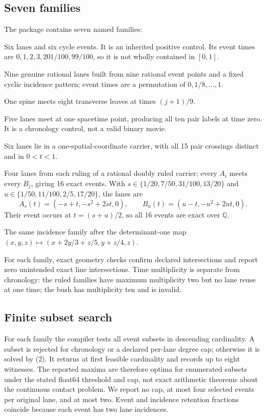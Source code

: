 \documentclass[11pt]{article}
\theoremstyle{definition}
\theoremstyle{remark}
\newcommand{\Q}{\mathbb Q}
\begin{document}
\subsection{Seven families}
The package contains seven named families:
\begin{description}[leftmargin=2em,style=nextline]
\item[Strict $C_{12}$ control.] Six lanes and six cycle events. It is an inherited positive control. Its event times are $0,1,2,3,201/100,99/100$, so it is not wholly contained in $[0,1]$.
\item[Generic rational $C_{18}$.] Nine genuine rational lanes built from nine rational event points and a fixed cyclic incidence pattern; event times are a permutation of $0,1/8,\ldots,1$.
\item[Time-separated hinge.] One spine meets eight transverse leaves at times $(j+1)/9$.
\item[Simultaneous bush $K_5$.] Five lanes meet at one spacetime point, producing all ten pair labels at time zero. It is a chronology control, not a valid binary movie.
\item[Planar weave $K_6$.] Six lanes lie in a one-spatial-coordinate carrier, with all 15 pair crossings distinct and in $0<t<1$.
\item[Ruled $K_{4,4}$.] Four lanes from each ruling of a rational doubly ruled carrier; every $A_i$ meets every $B_j$, giving 16 exact events. With $s\in\{1/20,7/50,31/100,13/20\}$ and $u\in\{1/50,11/100,2/5,17/20\}$, the lanes are
\[
 A_s(t)=(-s+t,-s^2+2st,0),\qquad B_u(t)=(u-t,-u^2+2ut,0).
\]
Their event occurs at $t=(s+u)/2$, so all 16 events are exact over $\Q$.
\item[Sheared ruled $K_{4,4}$.] The same incidence family after the determinant-one map $(x,y,z)\mapsto(x+2y/3+z/5,y+z/4,z)$.
\end{description}
For each family, exact geometry checks confirm declared intersections and report zero unintended exact line intersections. Time multiplicity is separate from chronology: the ruled families have maximum multiplicity two but no lane reuse at one time; the bush has multiplicity ten and is invalid.

\subsection{Finite subset search}
For each family the compiler tests all event subsets in descending cardinality. A subset is rejected for chronology or a declared per-lane degree cap; otherwise it is solved by (2). It returns at first feasible cardinality and records up to eight witnesses. The reported maxima are therefore optima for enumerated subsets under the stated float64 threshold and cap, not exact arithmetic theorems about the continuous contact problem. We report no cap, at most four selected events per original lane, and at most two. Event and incidence retention fractions coincide because each event has two lane incidences.
\end{document}
